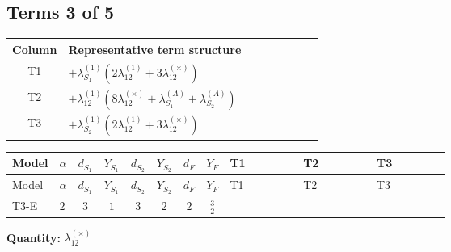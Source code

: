 \documentclass[8pt]{article}
\begin{document}
\begin{landscape}
\subsection*{Terms 3 of 5}
\begin{center}
\begin{tabular}{@{}c >{\raggedright\arraybackslash}p{0.82\linewidth}@{}}
\toprule
Column & Representative term structure \\
\midrule
T1 & \(\displaystyle +{\lambda_{S_1}^{(1)}} (2 {\lambda_{12}^{(1)}}+3 {\lambda_{12}^{(\times)}})\) \\
\midrule
T2 & \(\displaystyle +{\lambda_{12}^{(1)}} (8 {\lambda_{12}^{(\times)}}+{\lambda_{S_1}^{(A)}}+{\lambda_{S_2}^{(A)}})\) \\
\midrule
T3 & \(\displaystyle +{\lambda_{S_2}^{(1)}} (2 {\lambda_{12}^{(1)}}+3 {\lambda_{12}^{(\times)}})\) \\
\midrule
\bottomrule
\end{tabular}
\end{center}
\smallskip
\tiny
\begin{longtable}{@{}llcccccc >{\raggedright\arraybackslash}p{0.21\linewidth} >{\raggedright\arraybackslash}p{0.21\linewidth} >{\raggedright\arraybackslash}p{0.21\linewidth}@{}}
\toprule
Model & $\alpha$ & $d_{S_1}$ & $Y_{S_1}$ & $d_{S_2}$ & $Y_{S_2}$ & $d_F$ & $Y_F$ & T1 & T2 & T3 \\
\midrule
\endfirsthead
\toprule
Model & $\alpha$ & $d_{S_1}$ & $Y_{S_1}$ & $d_{S_2}$ & $Y_{S_2}$ & $d_F$ & $Y_F$ & T1 & T2 & T3 \\
\midrule
\endhead
T3-E & $2$ & $3$ & $1$ & $3$ & $2$ & $2$ & $\frac{3}{2}$ & \scriptsize\adjustbox{max width=\linewidth}{$\begin{gathered} +{\lambda_{S_1}^{(1)}} (2 {\lambda_{12}^{(1)}}+3 {\lambda_{12}^{(\times)}})\end{gathered}$} & \scriptsize\adjustbox{max width=\linewidth}{$\begin{gathered} +{\lambda_{12}^{(1)}} (8 {\lambda_{12}^{(\times)}}+{\lambda_{S_1}^{(A)}}+{\lambda_{S_2}^{(A)}})\end{gathered}$} & \scriptsize\adjustbox{max width=\linewidth}{$\begin{gathered} +{\lambda_{S_2}^{(1)}} (2 {\lambda_{12}^{(1)}}+3 {\lambda_{12}^{(\times)}})\end{gathered}$} \\
\midrule
\bottomrule
\end{longtable}
\clearpage
\noindent\textbf{Quantity: }$\lambda_{12}^{(\times)}$\par\smallskip

\end{landscape}
\end{document}
